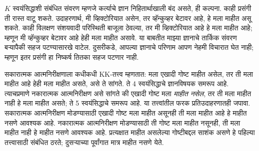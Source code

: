 \documentclass[../../../include/open-logic-section]{subfiles}
\begin{document}
$K$ स्वयंसिद्धाशी संबंधित संवरण म्हणजे कर्त्याचे
ज्ञान निहितार्थाखाली बंद असते, ही कल्पना. काही
प्रसंगी ती रास्त वाटू शकते. उदाहरणार्थ, मी
व्हिक्टोरियात असेन, तर व्हॅन्कुव्हर बेटावर आहे,
हे मला माहीत असू शकते. काही विलक्षण संशयवादी
परिस्थिती बाजूला ठेवल्या, तर मी व्हिक्टोरियात
आहे हे मला माहीत आहे; म्हणून मी व्हॅन्कुव्हर
बेटावर आहे हेही मला माहीत असावे. या बाबतीत
माझ्या ज्ञानाचे तार्किक संवरण बऱ्यापैकी सहज
पटण्यासारखे वाटेल. दुसरीकडे, आपल्या ज्ञानाचे
परिणाम आपण नेहमी विचारात घेत नाही; म्हणून इतर
प्रसंगी हा निष्कर्ष तितका सहज पटणार नाही.

सकारात्मक आत्मनिरीक्षणाला कधीकधी KK-तत्त्व म्हणतात:
मला एखादी गोष्ट माहीत असेल, तर ती मला माहीत आहे
हेही मला माहीत असते, असे ते सांगते. ते 4 स्वयंसिद्धाचे
ज्ञानविषयक समरूप आहे. त्याचप्रमाणे नकारात्मक
आत्मनिरीक्षण असे सांगते की एखादी गोष्ट मला
\emph{माहीत नसेल}, तर ती मला माहीत नाही हे मला
माहीत असते; ते 5 स्वयंसिद्धाचे समरूप आहे. या
तत्त्वांतील फरक प्रतिउदाहरणातही जपावा. सकारात्मक
आत्मनिरीक्षण मोडण्यासाठी एखादी गोष्ट मला माहीत असूनही
ती मला माहीत आहे हे माहीत नसणे आवश्यक आहे.
नकारात्मक आत्मनिरीक्षण मोडण्यासाठी ती गोष्ट मला
माहीत नसूनही, ती मला माहीत नाही हे माहीत नसणे
आवश्यक आहे. प्रत्यक्षात माहीत असलेल्या गोष्टीबद्दल
साशंक असणे हे पहिल्या तत्त्वासाठी संबंधित ठरते;
दुसऱ्याच्या पूर्वांगात मात्र माहीत नसणे येते.
\end{document}
